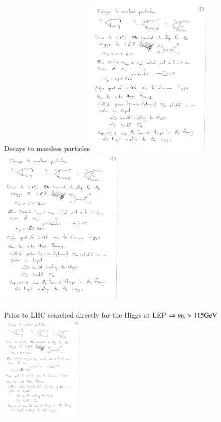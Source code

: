 {Decays to massless particles
\bc
\includegraphics[width=0.45\textwidth]{./hgg.pdf}
\includegraphics[width=0.45\textwidth]{./hGamGam.pdf}
\ec

Prior to LHC searched directly for the Higgs at LEP $\Rightarrow m_h > 115 \textrm{GeV}$
\bc
\includegraphics[width=0.3\textwidth]{./eeZH.pdf}
\ec

}
